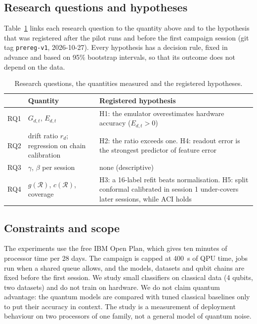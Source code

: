 \documentclass[10pt,conference]{IEEEtran}
\begin{document}
\subsection{Research questions and hypotheses}
Table~\ref{tab:rq} links each research question to the quantity above and to the hypothesis that
was registered after the pilot runs and before the first campaign session (git tag
\texttt{prereg-v1}, 2026-10-27). Every hypothesis has a decision rule, fixed in advance and
based on 95\% bootstrap intervals, so that its outcome does not depend on the data.

\begin{table}[t]
\centering
\caption{Research questions, the quantities measured and the registered hypotheses.}
\label{tab:rq}
\footnotesize
\setlength{\tabcolsep}{3pt}
\begin{tabular}{@{}l>{\raggedright\arraybackslash}p{2.35cm}>{\raggedright\arraybackslash}p{4.2cm}@{}}
\toprule
 & Quantity & Registered hypothesis \\
\midrule
RQ1 & $G_{d,t}$, $E_{d,t}$ & H1: the emulator overestimates hardware accuracy ($E_{d,t}>0$) \\
RQ2 & drift ratio $r_d$; regression on chain calibration & H2: the ratio exceeds one. H4: readout error is the strongest predictor of feature error \\
RQ3 & $\gamma$, $\beta$ per session & none (descriptive) \\
RQ4 & $g(\mathcal R)$, $c(\mathcal R)$, coverage & H3: a 16-label refit beats normalisation. H5: split conformal calibrated in session 1 under-covers later sessions, while ACI holds \\
\bottomrule
\end{tabular}
\end{table}

\subsection{Constraints and scope}
The experiments use the free IBM Open Plan, which gives ten minutes of processor time per 28
days. The campaign is capped at 400~s of QPU time, jobs run when a shared queue
allows, and the models, datasets and qubit chains are fixed before the first session. We study
small classifiers on classical data (4 qubits, two datasets) and do not train on
hardware. We do not claim quantum advantage: the quantum models are compared with tuned
classical baselines only to put their accuracy in context. The study is a measurement of
deployment behaviour on two processors of one family, not a general model of quantum noise.
\end{document}

